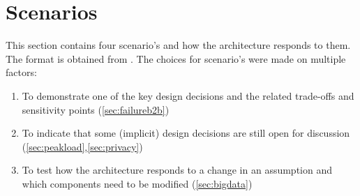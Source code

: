 \section{Scenarios}

This section contains four scenario's and how the architecture responds to them. The format is obtained from \cite{clemens}. The choices for scenario's were made on multiple factors:
\begin{enumerate}
\itemsep0em 
\item To demonstrate one of the key design decisions and the related trade-offs and sensitivity points (\ref{sec:failureb2b})
\item To indicate that some (implicit) design decisions are still open for discussion (\ref{sec:peakload},\ref{sec:privacy})
\item To test how the architecture responds to a change in an assumption and which components need to be modified (\ref{sec:bigdata})
\end{enumerate}

